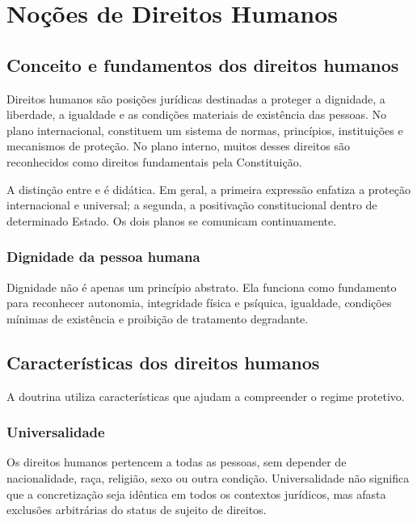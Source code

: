 \chapter{Noções de Direitos Humanos}

\section{Conceito e fundamentos dos direitos humanos}

Direitos humanos são posições jurídicas destinadas a proteger a dignidade, a liberdade, a igualdade e as condições materiais de existência das pessoas. No plano internacional, constituem um sistema de normas, princípios, instituições e mecanismos de proteção. No plano interno, muitos desses direitos são reconhecidos como direitos fundamentais pela Constituição.

A distinção entre  e  é didática. Em geral, a primeira expressão enfatiza a proteção internacional e universal; a segunda, a positivação constitucional dentro de determinado Estado. Os dois planos se comunicam continuamente.

\subsection{Dignidade da pessoa humana}

Dignidade não é apenas um princípio abstrato. Ela funciona como fundamento para reconhecer autonomia, integridade física e psíquica, igualdade, condições mínimas de existência e proibição de tratamento degradante.

\section{Características dos direitos humanos}

A doutrina utiliza características que ajudam a compreender o regime protetivo.

\subsection{Universalidade}

Os direitos humanos pertencem a todas as pessoas, sem depender de nacionalidade, raça, religião, sexo ou outra condição. Universalidade não significa que a concretização seja idêntica em todos os contextos jurídicos, mas afasta exclusões arbitrárias do status de sujeito de direitos.

